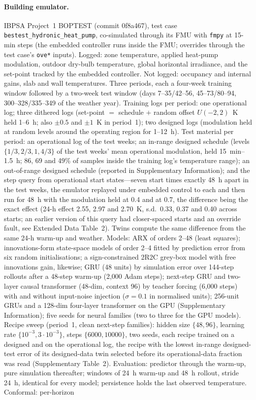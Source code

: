 \documentclass[11pt]{article}
\begin{document}
\paragraph{Building emulator.} IBPSA Project~1 BOPTEST \citep{blum2021boptest} (commit 0f8a467), test case \texttt{bestest\_hydronic\_heat\_pump}, co-simulated through its FMU with \texttt{fmpy} at 15-min steps (the embedded controller runs inside the FMU; overrides through the test case's \texttt{ove*} inputs). Logged: zone temperature, applied heat-pump modulation, outdoor dry-bulb temperature, global horizontal irradiance, and the set-point tracked by the embedded controller. Not logged: occupancy and internal gains, slab and wall temperatures. Three periods, each a four-week training window followed by a two-week test window (days 7--35/42--56, 45--73/80--94, 300--328/335--349 of the weather year). Training logs per period: one operational log; three dithered logs (set-point $=$ schedule $+$ random offset $U(-2,2)$~K held 1--6~h; also $\pm0.5$ and $\pm1$~K in period~1); two designed logs (modulation held at random levels around the operating region for 1--12~h). Test material per period: an operational log of the test weeks; an in-range designed schedule (levels $\{1/3,2/3,1,4/3\}$ of the test weeks' mean operational modulation, held 15~min--1.5~h; 86, 69 and 49\% of samples inside the training log's temperature range); an out-of-range designed schedule (reported in Supplementary Information); and the step query from operational start states---seven start times exactly 48~h apart in the test weeks, the emulator replayed under embedded control to each and then run for 48~h with the modulation held at 0.4 and at 0.7, the difference being the exact effect (24-h effect 2.55, 2.97 and 2.70~K, s.d.\ 0.33, 0.37 and 0.40 across starts; an earlier version of this query had closer-spaced starts and an override fault, see Extended Data Table~2). Twins compute the same difference from the same 24-h warm-up and weather. Models: ARX of orders 2--48 (least squares); innovations-form state-space models of order 2--4 fitted by prediction error from six random initialisations; a sign-constrained 2R2C grey-box model with free innovations gain, likewise; GRU (48 units) by simulation error over 144-step rollouts after a 48-step warm-up (2,000 Adam steps); next-step GRU and two-layer causal transformer (48-dim, context 96) by teacher forcing (6,000 steps) with and without input-noise injection ($\sigma=0.1$ in normalised units); 256-unit GRUs and a 128-dim four-layer transformer on the GPU (Supplementary Information); five seeds for neural families (two to three for the GPU models). Recipe sweep (period~1, clean next-step families): hidden size $\{48,96\}$, learning rate $\{10^{-3},3\cdot10^{-3}\}$, steps $\{6000,10000\}$, two seeds, each recipe trained on a designed and on the operational log, the recipe with the lowest in-range designed-test error of its designed-data twin selected before its operational-data fraction was read (Supplementary Table~2). Evaluation: predictor through the warm-up, pure simulation thereafter; windows of 24~h warm-up and 48~h rollout, stride 24~h, identical for every model; persistence holds the last observed temperature. Conformal: per-horizon 
\end{document}
